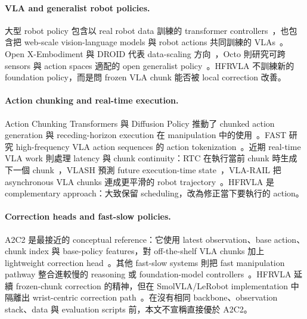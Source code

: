 \documentclass[10pt]{article}
\newcommand{\method}{HFRVLA}
\newcommand{\smolvla}{SmolVLA}
\begin{document}
\paragraph{VLA and generalist robot policies.}
大型 robot policy 包含以 real robot data 訓練的 transformer controllers~\citep{brohan2022rt1}，也包含把 web-scale vision-language models 與 robot actions 共同訓練的 VLAs~\citep{brohan2023rt2,kim2024openvla,black2024pi0,shukor2025smolvla}。Open X-Embodiment 與 DROID 代表 data-scaling 方向~\citep{openx2024,khazatsky2024droid}，Octo 則研究可跨 sensors 與 action spaces 適配的 open generalist policy~\citep{ghosh2024octo}。\method{} 不訓練新的 foundation policy，而是問 frozen VLA chunk 能否被 local correction 改善。

\paragraph{Action chunking and real-time execution.}
Action Chunking Transformers 與 Diffusion Policy 推動了 chunked action generation 與 receding-horizon execution 在 manipulation 中的使用~\citep{zhao2023aloha,chi2023diffusionpolicy}。FAST 研究 high-frequency VLA action sequences 的 action tokenization~\citep{pertsch2025fast}。近期 real-time VLA work 則處理 latency 與 chunk continuity：RTC 在執行當前 chunk 時生成下一個 chunk~\citep{black2025rtc}，VLASH 預測 future execution-time state~\citep{tang2025vlash}，VLA-RAIL 把 asynchronous VLA chunks 連成更平滑的 robot trajectory~\citep{zhao2025vlarail}。\method{} 是 complementary approach：大致保留 scheduling，改為修正當下要執行的 action。

\paragraph{Correction heads and fast-slow policies.}
A2C2 是最接近的 conceptual reference：它使用 latest observation、base action、chunk index 與 base-policy features，對 off-the-shelf VLA chunks 加上 lightweight correction head~\citep{sendai2025a2c2}。其他 fast-slow systems 則把 fast manipulation pathway 整合進較慢的 reasoning 或 foundation-model controllers~\citep{chen2025fastinslow,zou2025duocorefs,xue2025rdp,xie2026dynamicvla}。\method{} 延續 frozen-chunk correction 的精神，但在 \smolvla{}/LeRobot implementation 中隔離出 wrist-centric correction path~\citep{cadene2026lerobot}。在沒有相同 backbone、observation stack、data 與 evaluation scripts 前，本文不宣稱直接優於 A2C2。
\end{document}
